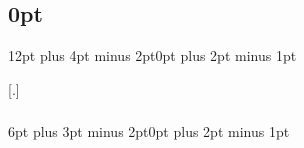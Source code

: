\titleformat{\subsection}{\bfseries\sffamily\raggedright}{\thesubsection}{0.5em}{}
\titlespacing\subsection{0pt}{12pt plus 4pt minus 2pt}{0pt plus 2pt minus 1pt}

\titleformat{\subsubsection}[runin]{\bfseries\sffamily}{\thesubsubsection}{0.5em}{}[.\hspace*{0.5em}]
\titlespacing\subsubsection{\parindent}{6pt plus 3pt minus 2pt}{0pt plus 2pt minus 1pt}


\usepackage{fancyhdr}              %
\pagestyle{fancy}                  %
\fancyhf{}                         %
\fancyfoot[C]{\thepage}            %
\renewcommand{\footrulewidth}{1pt} %
\renewcommand{\headrulewidth}{0pt} %


\usepackage{biblatex}                       %


\usepackage[
    acronym,     %
    nopostdot,   %
    nonumberlist %
]{glossaries}
\renewcommand*{\glsnamefont}[1]{\textbf{\sffamily #1}} %
\makeglossaries                                        %

